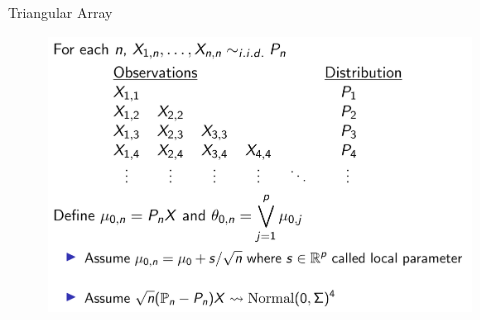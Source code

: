 \documentclass[aspectratio=169, professionalfonts]{beamer}
\begin{document}
\begin{frame}{Triangular Array}
	\begin{figure}
		\includegraphics[width=.85\textwidth]{figures/triangular-array}
	\end{figure}
\end{frame}
\end{document}
